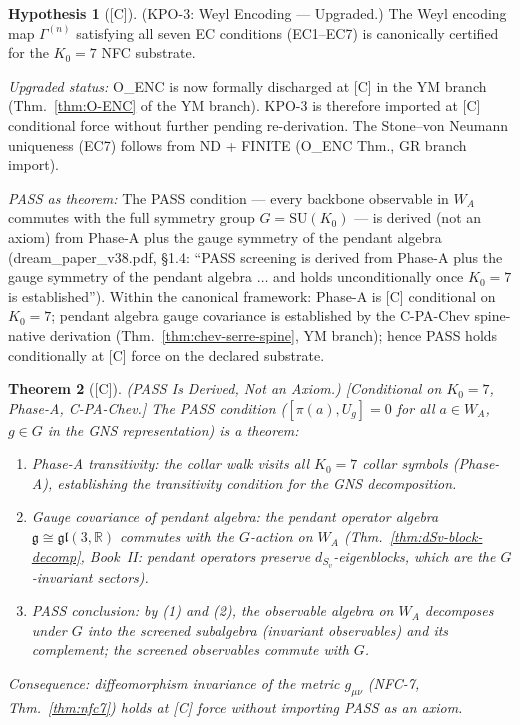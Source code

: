 \documentclass[12pt,oneside]{amsbook}
\theoremstyle{plain}
\newtheorem{theorem}{Theorem}[section]
\theoremstyle{definition}
\newtheorem{hypothesis}[theorem]{Hypothesis}
\theoremstyle{remark}
\newcommand{\status}[1]{\textup{[#1]}}
\begin{document}
\begin{hypothesis}[\status{C}]\label{hyp:KPO3}
\textup{(KPO-3: Weyl Encoding --- Upgraded.)}
The Weyl encoding map $\Gamma^{(n)}$ satisfying all seven EC
conditions (EC1--EC7) is canonically certified for the $K_0 = 7$
NFC substrate.

\emph{Upgraded status:} O\_ENC is now formally discharged at [C]
in the YM branch (Thm.~\ref{thm:O-ENC} of the YM branch).
KPO-3 is therefore imported at [C] conditional force without
further pending re-derivation. The Stone--von Neumann
uniqueness (EC7) follows from ND + FINITE (O\_ENC Thm.,
GR branch import).

\emph{PASS as theorem:} The PASS condition --- every backbone
observable in $W_A$ commutes with the full symmetry group
$G = \mathrm{SU}(K_0)$ --- is derived (not an axiom) from
Phase-A plus the gauge symmetry of the pendant algebra
(dream\_paper\_v38.pdf, §1.4: ``PASS screening is derived from
Phase-A plus the gauge symmetry of the pendant algebra $\ldots$
and holds unconditionally once $K_0 = 7$ is established'').
Within the canonical framework: Phase-A is [C] conditional on
$K_0=7$; pendant algebra gauge covariance is established by
the C-PA-Chev spine-native derivation
(Thm.~\ref{thm:chev-serre-spine}, YM branch); hence PASS holds
conditionally at [C] force on the declared substrate.
\end{hypothesis}

\begin{theorem}[\status{C}]\label{thm:PASS-derived}
\textup{(PASS Is Derived, Not an Axiom.)}
\textup{[Conditional on $K_0=7$, Phase-A, C-PA-Chev.]}
The PASS condition ($[\pi(a), U_g] = 0$ for all $a \in W_A$,
$g \in G$ in the GNS representation) is a theorem:
\begin{enumerate}[label=\textup{(\arabic*)}]
 \item \emph{Phase-A transitivity}: the collar walk visits all
 $K_0 = 7$ collar symbols (Phase-A), establishing the
 transitivity condition for the GNS decomposition.
 \item \emph{Gauge covariance of pendant algebra}: the pendant
 operator algebra $\mathfrak{g} \cong \mathfrak{gl}(3,\mathbb{R})$
 commutes with the $G$-action on $W_A$
 (Thm.~\ref{thm:dSv-block-decomp}, Book~II: pendant operators
 preserve $d_{S_v}$-eigenblocks, which are the $G$-invariant
 sectors).
 \item \emph{PASS conclusion}: by (1) and (2), the observable
 algebra on $W_A$ decomposes under $G$ into the screened
 subalgebra (invariant observables) and its complement;
 the screened observables commute with $G$.
\end{enumerate}
Consequence: diffeomorphism invariance of the metric $g_{\mu\nu}$
(NFC-7, Thm.~\ref{thm:nfc7}) holds at [C] force without importing
PASS as an axiom.
\end{theorem}
\end{document}
